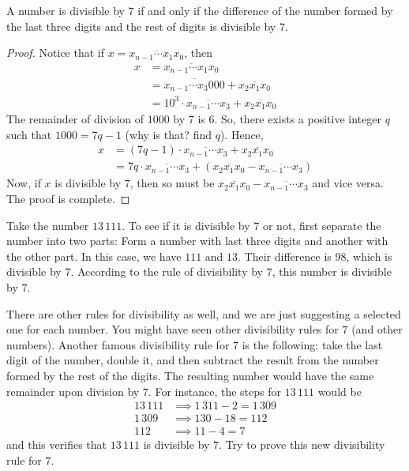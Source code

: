 \documentclass{subfile}
\begin{document}
\begin{proposition}[Divisibility by $7$]\label{prop:divisibility-7}
	A number is divisible by $7$ if and only if the difference of the number formed by the last three digits and the rest of digits is divisible by $7$.
\end{proposition}

\begin{proof}
	Notice that if $x = \overline{x_{n-1} \cdots x_1 x_0 }$, then
		\begin{align*}
			x &= \overline{x_{n-1} \cdots x_1 x_0 }\\
			  &= \overline{x_{n-1} \cdots x_3 000 } +  \overline{x_{2} x_1 x_0 }\\
			  &= 10^3 \cdot \overline{x_{n-1} \cdots x_3} +  \overline{x_{2} x_1 x_0 }
		\end{align*}
	The remainder of division of $1000$ by $7$ is $6$. So, there exists a positive integer $q$ such that $1000 = 7q - 1$ (why is that? find $q$). Hence,
		\begin{align*}
			x &= (7q-1) \cdot \overline{x_{n-1} \cdots x_3} +  \overline{x_{2} x_1 x_0 }\\
			  &= 7q \cdot \overline{x_{n-1} \cdots x_3} + \left(\overline{x_{2} x_1 x_0 } - \overline{x_{n-1} \cdots x_3}\right)
		\end{align*}
	Now, if $x$ is divisible by $7$, then so must be $\overline{x_{2} x_1 x_0 } - \overline{x_{n-1} \cdots x_3}$ and vice versa. The proof is complete.
\end{proof}


\begin{example}
	Take the number $13\, 111$. To see if it is divisible by $7$ or not, first separate the number into two parts: Form a number with last three digits and another with the other part. In this case, we have $111$ and $13$. Their difference is $98$, which is divisible by $7$. According to the rule of divisibility by $7$, this number is divisible by $7$.
\end{example}

There are other rules for divisibility as well, and we are just suggesting a selected one for each number. You might have seen other divisibility rules for $7$ (and other numbers). Another famous divisibility rule for $7$ is the following: take the last digit of the number, double it, and then subtract the result from the number formed by the rest of the digits. The resulting number would have the same remainder upon division by $7$. For instance, the steps for $13\, 111$ would be
	\begin{align*}
		13\, 111 & \implies 1\,311 - 2 = 1\, 309\\
		1\, 309  & \implies 130 - 18 = 112\\
		112 &\implies 11 - 4 = 7
	\end{align*}
and this verifies that $13\, 111$ is divisible by $7$. Try to prove this new divisibility rule for $7$.
\end{document}
